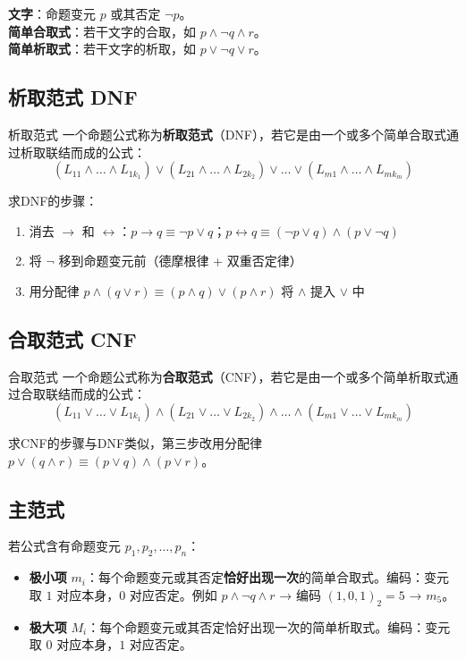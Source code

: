 \textbf{文字}：命题变元 $p$ 或其否定 $\neg p$。\\
\textbf{简单合取式}：若干文字的合取，如 $p \land \neg q \land r$。\\
\textbf{简单析取式}：若干文字的析取，如 $p \lor \neg q \lor r$。

\subsection{析取范式 DNF}

\begin{mydefinition}{析取范式}
一个命题公式称为\textbf{析取范式}（DNF），若它是由一个或多个简单合取式通过析取联结而成的公式：
\[(L_{11} \land \dots \land L_{1k_1}) \lor (L_{21} \land \dots \land L_{2k_2}) \lor \dots \lor (L_{m1} \land \dots \land L_{mk_m})\]
\end{mydefinition}

求DNF的步骤：
\begin{enumerate}
\item 消去 $\rightarrow$ 和 $\leftrightarrow$：$p \rightarrow q \equiv \neg p \lor q$；$p \leftrightarrow q \equiv (\neg p \lor q) \land (p \lor \neg q)$
\item 将 $\neg$ 移到命题变元前（德摩根律 + 双重否定律）
\item 用分配律 $p \land (q \lor r) \equiv (p \land q) \lor (p \land r)$ 将 $\land$ 提入 $\lor$ 中
\end{enumerate}

\subsection{合取范式 CNF}

\begin{mydefinition}{合取范式}
一个命题公式称为\textbf{合取范式}（CNF），若它是由一个或多个简单析取式通过合取联结而成的公式：
\[(L_{11} \lor \dots \lor L_{1k_1}) \land (L_{21} \lor \dots \lor L_{2k_2}) \land \dots \land (L_{m1} \lor \dots \lor L_{mk_m})\]
\end{mydefinition}

求CNF的步骤与DNF类似，第三步改用分配律 $p \lor (q \land r) \equiv (p \lor q) \land (p \lor r)$。

\subsection{主范式}

若公式含有命题变元 $p_1, p_2, \dots, p_n$：
\begin{itemize}
\item \textbf{极小项} $m_i$：每个命题变元或其否定\textbf{恰好出现一次}的简单合取式。编码：变元取 $1$ 对应本身，$0$ 对应否定。例如 $p \land \neg q \land r$ → 编码 $(1,0,1)_2=5$ → $m_5$。
\item \textbf{极大项} $M_i$：每个命题变元或其否定恰好出现一次的简单析取式。编码：变元取 $0$ 对应本身，$1$ 对应否定。
\end{itemize}

